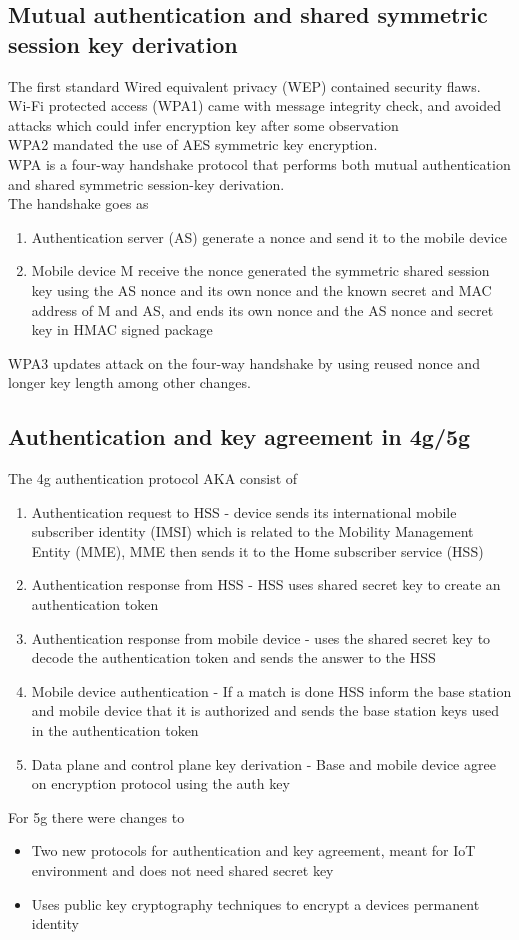 \documentclass[12pt, a4paper]{article}
\begin{document}
		\subsection{Mutual authentication and shared symmetric session key derivation}
			The first standard Wired equivalent privacy (WEP) contained security flaws.\\
			Wi-Fi protected access (WPA1) came with message integrity check, and avoided attacks which could infer encryption key after some observation\\
			WPA2 mandated the use of AES symmetric key encryption.\\
			WPA is a four-way handshake protocol that performs both mutual authentication and shared symmetric session-key derivation.\\
			The handshake goes as
			\begin{enumerate}
				\item Authentication server (AS) generate a nonce and send it to the mobile device
				\item Mobile device M receive the nonce generated the symmetric shared session key using the AS nonce and its own nonce and the known secret and MAC address of M and AS, and ends its own nonce and the AS nonce and secret key in HMAC signed package
			\end{enumerate}
			WPA3 updates attack on the four-way handshake by using reused nonce and longer key length among other changes.\\
		\subsection{Authentication and key agreement in 4g/5g}
			The 4g authentication protocol AKA consist of 
			\begin{enumerate}
				\item Authentication request to HSS - device sends its international mobile subscriber identity (IMSI) which is related to the Mobility Management Entity (MME), MME then sends it to the Home subscriber service (HSS)
				\item Authentication response from HSS - HSS uses shared secret key to create an authentication token
				\item Authentication response from mobile device - uses the shared secret key to decode the authentication token and sends the answer to the HSS
				\item Mobile device authentication - If a match is done HSS inform the base station and mobile device that it is authorized and sends the base station keys used in the authentication token
				\item Data plane and control plane key derivation - Base and mobile device agree on encryption protocol using the auth key
			\end{enumerate}
			For 5g there were changes to
			\begin{itemize}
				\item Two new protocols for authentication and key agreement, meant for IoT environment and does not need shared secret key
				\item Uses public key cryptography techniques to encrypt a devices permanent identity
			\end{itemize}
\end{document}
